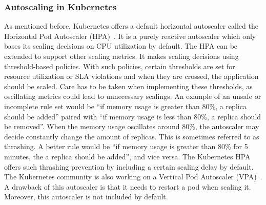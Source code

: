 \subsubsection{Autoscaling in Kubernetes}
As mentioned before, Kubernetes offers a default horizontal autoscaler called the Horizontal Pod Autoscaler (HPA)~\citep{HPA}. It is a purely reactive autoscaler which only bases its scaling decisions on CPU utilization by default. The HPA can be extended to support other scaling metrics. It makes scaling decisions using threshold-based policies. With such policies, certain thresholds are set for resource utilization or SLA violations and when they are crossed, the application should be scaled. Care has to be taken when implementing these thresholds, as oscillating metrics could lead to unnecessary scalings. An example of an unsafe or incomplete rule set would be ``if memory usage is greater than 80\%, a replica should be added'' paired with ``if memory usage is less than 80\%, a replica should be removed''. When the memory usage oscillates around 80\%, the autoscaler may decide constantly change the amount of replicas. This is sometimes referred to as thrashing. A better rule would be ``if memory usage is greater than 80\% for 5 minutes, the a replica should be added'', and vice versa. The Kubernetes HPA offers such thrashing prevention by including a certain scaling delay by default.\\

The Kubernetes community is also working on a Vertical Pod Autoscaler (VPA)~\citep{VPA}. A drawback of this autoscaler is that it needs to restart a pod when scaling it. Moreover, this autoscaler is not included by default.

